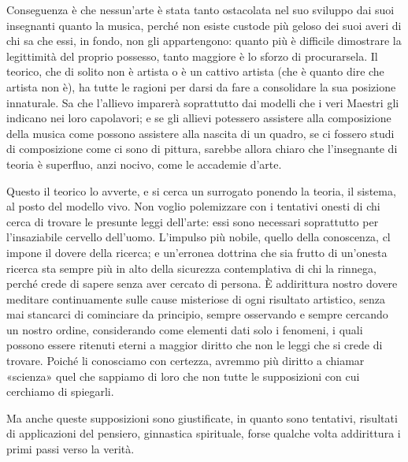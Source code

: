 \documentclass{../../lib/gs}
\begin{document}
Conseguenza è che nessun'arte è stata tanto ostacolata nel suo sviluppo dai suoi insegnanti quanto la musica, perché non esiste custode più geloso dei suoi averi di chi sa che essi, in fondo, non gli appartengono: quanto più è difficile dimostrare la legittimità del proprio possesso, tanto maggiore è lo sforzo di procurarsela. Il teorico, che di solito non è artista o è un cattivo artista (che è quanto dire che artista non è), ha tutte le ragioni per darsi da fare a consolidare la sua posizione innaturale. Sa che l'allievo imparerà soprattutto dai modelli che i veri Maestri gli indicano nei loro capolavori; e se gli allievi potessero assistere alla composizione della musica come possono assistere alla nascita di un quadro, se ci fossero studi di composizione come ci sono di pittura, sarebbe allora chiaro che l'insegnante di teoria è superfluo, anzi nocivo, come le accademie d'arte.

Questo il teorico lo avverte, e si cerca un surrogato ponendo la teoria, il sistema, al posto del modello vivo.
Non voglio polemizzare con i tentativi onesti di chi cerca di trovare le presunte leggi dell'arte: essi sono necessari soprattutto per l'insaziabile cervello dell'uomo. L'impulso più nobile, quello della conoscenza, cl impone il dovere della ricerca; e un'erronea dottrina che sia frutto di un'onesta ricerca sta sempre più in alto della sicurezza contemplativa di chi la rinnega, perché crede di sapere senza aver cercato di persona. È addirittura nostro dovere meditare continuamente sulle cause misteriose di ogni risultato artistico, senza mai stancarci di cominciare da principio, sempre osservando e sempre cercando un nostro ordine, considerando come elementi dati solo i fenomeni, i quali possono essere ritenuti eterni a maggior diritto che non le leggi che si crede di trovare. Poiché li conosciamo con certezza, avremmo più diritto a chiamar «scienza» quel che sappiamo di loro che non tutte le supposizioni con cui cerchiamo di spiegarli.

Ma anche queste supposizioni sono giustificate, in quanto sono tentativi, risultati di applicazioni del pensiero, ginnastica spirituale, forse qualche volta addirittura i primi passi verso la verità.
\end{document}
